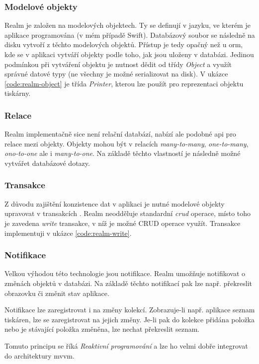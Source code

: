 \subsubsection*{Modelové objekty}

Realm je založen na modelových objektech.
Ty se definují v jazyku, ve kterém je aplikace programována (v mém případě Swift).
Databázový soubor se následně na disku vytvoří z těchto modelových objektů.
Přístup je tedy opačný než u \acrshort{orm}, kde se v aplikaci vytváří objekty podle toho, jak jsou uloženy v databázi.
Jedinou podmínkou při vytváření objektu je nutnost dědit od třídy \textit{Object} a využít správné datové typy (ne všechny je možné serializovat na disk). V ukázce \ref{code:realm-object} je třída \textit{Printer}, kterou lze použít pro reprezentaci objektu tiskárny.


\subsubsection*{Relace}

Realm implementačně sice není relační databází, nabízí ale podobné \acrshort{api} pro relace mezi objekty.
Objekty mohou být v relacích \textit{many-to-many}, \textit{one-to-many}, \textit{ono-to-one} ale i \textit{many-to-one}.
Na základě těchto vlastností je následně možné vytvářet databázové dotazy.

\subsubsection*{Transakce}

Z důvodu zajištění konzistence dat v aplikaci je nutné modelové objekty upravovat v transakcích \cite{realm-swift}.
Realm neodděluje standardní \textit{\acrshort{crud}} operace, místo toho je zavedena \textit{write} transakce, v níž je možné CRUD operace využít. Transakce implementuji v ukázce \ref{code:realm-write}.


\subsubsection*{Notifikace}

Velkou výhodou této technologie jsou notifikace.
Realm umožňuje notifikovat o změnách objektů v databázi.
Na základě těchto notifikací pak lze např. překreslit obrazovku či změnit stav aplikace.

Notifikace lze zaregistrovat i na změny kolekcí.
Zobrazuje-li např. aplikace seznam tiskáren, lze se zaregistrovat na jejich změny.
Je-li pak do kolekce přidána položka nebo je stávající položka změněna, lze nechat překreslit seznam.

Tomuto principu se říká \textit{Reaktivní programování} a lze ho velmi dobře integrovat do architektury \acrshort{mvvm}.
